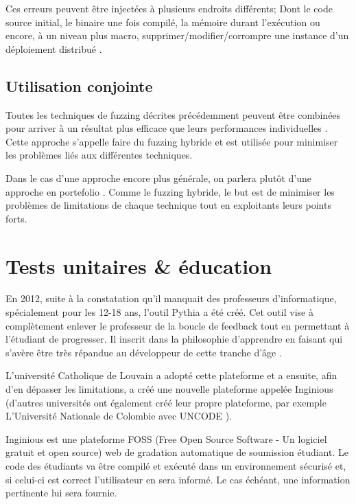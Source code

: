 \documentclass[a4paper]{report}
\begin{document}
Ces erreurs peuvent être injectées à plusieurs endroits différents; Dont le code source initial, le binaire une fois compilé, la mémoire durant l'exécution ou encore, à un niveau plus macro, supprimer/modifier/corrompre une instance d'un déploiement distribué \cite{Avresky1996}.

\subsection{Utilisation conjointe}

Toutes les techniques de fuzzing décrites précédemment peuvent être combinées pour arriver à un résultat plus efficace que leurs performances individuelles \cite{Godefroid2020}.
Cette approche s'appelle faire du fuzzing hybride et est utilisée pour minimiser les problèmes liés aux différentes techniques. 


Dans le cas d'une approche encore plus générale, on parlera plutôt d'une approche en portefolio \cite{Godefroid2020}.
Comme le fuzzing hybride, le but est de minimiser les problèmes de limitations de chaque technique tout en exploitants leurs points forts.

\section{Tests unitaires \& éducation}

En 2012, suite à la constatation qu'il manquait des professeurs d'informatique, spécialement pour les 12-18 ans, l'outil Pythia a été créé.
Cet outil vise à complètement enlever le professeur de la boucle de feedback tout en permettant à l'étudiant de progresser. Il inscrit dans la philosophie d'apprendre en faisant qui s'avère être très répandue au développeur de cette tranche d'âge \cite{combefis2012teaching}.

L'université Catholique de Louvain a adopté cette plateforme et a ensuite, afin d'en dépasser les limitations, a créé une nouvelle plateforme appelée Inginious (d'autres universités ont également créé leur propre plateforme, par exemple L'Université Nationale de Colombie avec UNCODE \cite{restrepo2018uncode}).

Inginious est une plateforme FOSS (Free Open Source Software - Un logiciel gratuit et open source) web de gradation automatique de soumission étudiant.
Le code des étudiants va être compilé et exécuté dans un environnement sécurisé et, si celui-ci est correct l'utilisateur en sera informé.
Le cas échéant, une information pertinente lui sera fournie.
\end{document}
